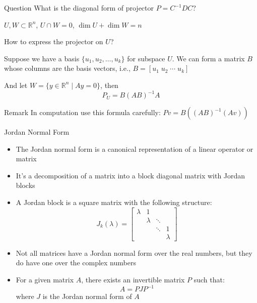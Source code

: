 \documentclass[fullscreen=true, bookmarks=true, hyperref={pdfencoding=unicode}]{beamer}
\begin{document}
\begin{frame}
  \begin{block}{Question}
    What is the diagonal form of projector $P = C^{-1}D C$?
  \end{block}  

  \pause
  \begin{example}
    $ U, W \subset \mathbb{R}^n$, $U \cap W = 0$, $\dim U + \dim W = n$

    How to express the projector on $U$?
  \end{example}

  Suppose we have a basis $\{u_1, u_2, \dots, u_k\}$ for subspace $U$. 
  We can form a matrix $B$ whose columns are the basis vectors, i.e., $B = [u_1 \; u_2 \; \cdots \; u_k]$

  And let $W = \{y \in \mathbb{R}^n \mid Ay=0\}$, then $$P_U = B(AB)^{-1}A$$

\begin{block}{Remark}
  In computation use this formula carefully:
  $P v= B\left((AB)^{-1}(Av)\right)$
\end{block}  
\end{frame}


\begin{frame}{Jordan Normal Form}
  \begin{itemize}
    \item The Jordan normal form is a canonical representation of a linear operator or matrix
    \item It's a decomposition of a matrix into a block diagonal matrix with Jordan blocks
    \item A Jordan block is a square matrix with the following structure:
      \[J_k(\lambda) = \begin{bmatrix}
        \lambda & 1      &        &        \\
                & \lambda & \ddots &        \\
                &        & \ddots & 1      \\
                &        &        & \lambda
      \end{bmatrix}\]
      \item Not all matrices have a Jordan normal form over the real numbers, 
      but they do have one over the complex numbers
      \item For a given matrix $A$, there exists an invertible matrix $P$ such that:
      \[A = PJP^{-1}\]
      where $J$ is the Jordan normal form of $A$ 
  \end{itemize}
\end{frame}
\end{document}
